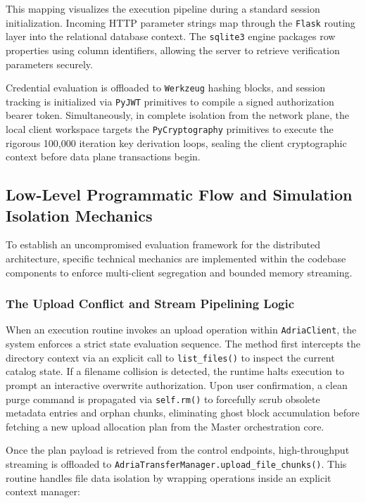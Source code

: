 This mapping visualizes the execution pipeline during a standard session initialization. Incoming HTTP parameter strings map through the \texttt{Flask} routing layer into the relational database context. The \texttt{sqlite3} engine packages row properties using column identifiers, allowing the server to retrieve verification parameters securely. 

Credential evaluation is offloaded to \texttt{Werkzeug} hashing blocks, and session tracking is initialized via \texttt{PyJWT} primitives to compile a signed authorization bearer token. Simultaneously, in complete isolation from the network plane, the local client workspace targets the \texttt{PyCryptography} primitives to execute the rigorous 100,000 iteration key derivation loops, sealing the client cryptographic context before data plane transactions begin.

\subsection{Low-Level Programmatic Flow and Simulation Isolation Mechanics}
To establish an uncompromised evaluation framework for the distributed architecture, specific technical mechanics are implemented within the codebase components to enforce multi-client segregation and bounded memory streaming.

\subsubsection{The Upload Conflict and Stream Pipelining Logic}
When an execution routine invokes an upload operation within \texttt{AdriaClient}, the system enforces a strict state evaluation sequence. The method first intercepts the directory context via an explicit call to \texttt{list\_files()} to inspect the current catalog state. If a filename collision is detected, the runtime halts execution to prompt an interactive overwrite authorization. Upon user confirmation, a clean purge command is propagated via \texttt{self.rm()} to forcefully scrub obsolete metadata entries and orphan chunks, eliminating ghost block accumulation before fetching a new upload allocation plan from the Master orchestration core.

Once the plan payload is retrieved from the control endpoints, high-throughput streaming is offloaded to \texttt{AdriaTransferManager.upload\_file\_chunks()}. This routine handles file data isolation by wrapping operations inside an explicit context manager:


